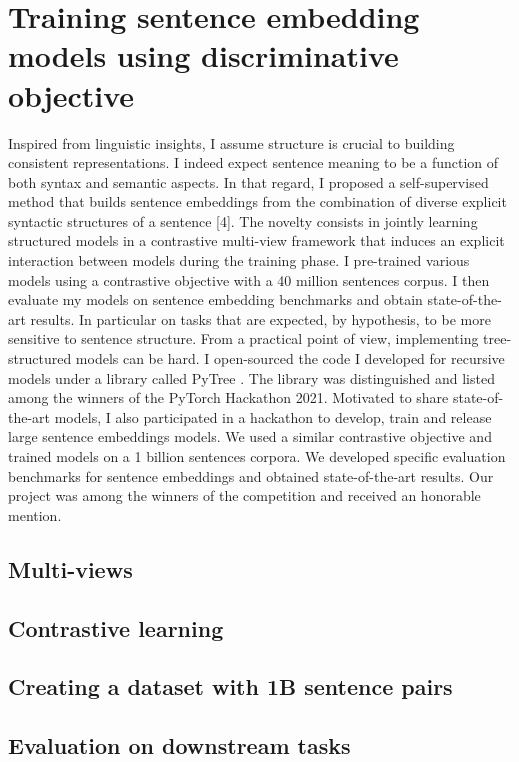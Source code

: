 \chapter{Training sentence embedding models using discriminative objective}

Inspired from linguistic insights, I assume structure is crucial to building consistent representations. I indeed expect sentence meaning to be a function of both syntax and semantic aspects. In that regard, I proposed a self-supervised method that builds sentence embeddings from the combination of diverse explicit syntactic structures of a sentence [4]. The novelty consists in jointly learning structured models in a contrastive multi-view framework that induces an explicit interaction between models during the training phase. I pre-trained various models using a contrastive objective with a 40 million sentences corpus. I then evaluate my models on sentence embedding benchmarks and obtain state-of-the-art results. In particular on tasks that are expected, by hypothesis, to be more sensitive to sentence structure. From a practical point of view, implementing tree-structured models can be hard. I open-sourced the code I developed for recursive models under a library called PyTree . The library was distinguished and listed among the winners of the PyTorch Hackathon 2021. Motivated to share state-of-the-art models, I also participated in a hackathon  to develop, train and release large sentence embeddings models. We used a similar contrastive objective and trained models on a 1 billion sentences corpora. We developed specific evaluation benchmarks for sentence embeddings and obtained state-of-the-art results. Our project was among the winners of the competition and received an honorable mention.

\section{Multi-views}

\section{Contrastive learning}

\section{Creating a dataset with 1B sentence pairs}

\section{Evaluation on downstream tasks}

